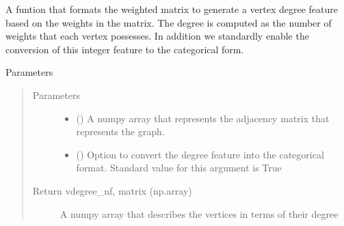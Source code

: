 \documentclass[letterpaper,10pt,english]{sphinxmanual}
\begin{document}
\begin{fulllineitems}
\begin{fulllineitems}
\label{\detokenize{modules/gqcml.data:gqcml.data.Data.Preprocessor.vdegree_nf}}
A funtion that formats the weighted matrix to generate a vertex degree feature based on the
weights in the matrix. The degree is computed as the number of weights that each vertex possesses.
In addition  we standardly enable the conversion of this integer feature to the
categorical form.

Parameters
\begin{quote}\begin{description}
\item[{Parameters}] \leavevmode\begin{itemize}
\item {} 
\sphinxstyleliteralstrong{\sphinxupquote{(}}\sphinxstyleliteralstrong{\sphinxupquote{)}} () \textendash{} A numpy array that represents the adjacency matrix that represents the
graph.

\item {} 
\sphinxstyleliteralstrong{\sphinxupquote{ (}}\sphinxstyleliteralstrong{\sphinxupquote{)}} (\sphinxstyleliteralemphasis{\sphinxupquote{(}}\sphinxstyleliteralemphasis{\sphinxupquote{)}}) \textendash{} Option to convert the degree feature into the categorical format.
Standard value for this argument is True

\end{itemize}

\item[{Return vdegree\_nf, matrix (np.array)}] \leavevmode
A numpy array that describes the vertices in terms of their degree

\end{description}\end{quote}

\end{fulllineitems}



\end{fulllineitems}
\end{document}
